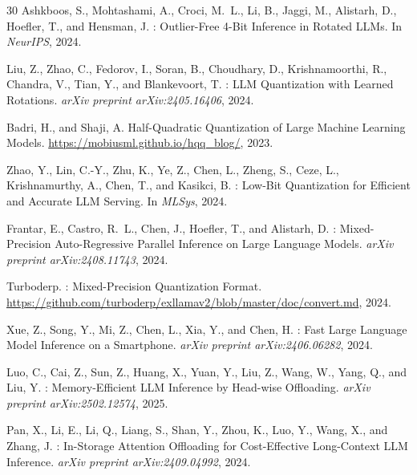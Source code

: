 \documentclass{article}
\begin{document}
\begin{thebibliography}{30}
Ashkboos, S., Mohtashami, A., Croci, M.~L., Li, B., Jaggi, M., Alistarh, D., Hoefler, T., and Hensman, J.
: Outlier-Free 4-Bit Inference in Rotated {LLM}s.
\newblock In \emph{NeurIPS}, 2024.

Liu, Z., Zhao, C., Fedorov, I., Soran, B., Choudhary, D., Krishnamoorthi, R., Chandra, V., Tian, Y., and Blankevoort, T.
: {LLM} Quantization with Learned Rotations.
\newblock \emph{arXiv preprint arXiv:2405.16406}, 2024.

Badri, H., and Shaji, A.
\newblock Half-Quadratic Quantization of Large Machine Learning Models.
\newblock \url{https://mobiusml.github.io/hqq_blog/}, 2023.

Zhao, Y., Lin, C.-Y., Zhu, K., Ye, Z., Chen, L., Zheng, S., Ceze, L., Krishnamurthy, A., Chen, T., and Kasikci, B.
: Low-Bit Quantization for Efficient and Accurate {LLM} Serving.
\newblock In \emph{MLSys}, 2024.

Frantar, E., Castro, R.~L., Chen, J., Hoefler, T., and Alistarh, D.
: Mixed-Precision Auto-Regressive Parallel Inference on Large Language Models.
\newblock \emph{arXiv preprint arXiv:2408.11743}, 2024.

Turboderp.
: Mixed-Precision Quantization Format.
\newblock \url{https://github.com/turboderp/exllamav2/blob/master/doc/convert.md}, 2024.

Xue, Z., Song, Y., Mi, Z., Chen, L., Xia, Y., and Chen, H.
: Fast Large Language Model Inference on a Smartphone.
\newblock \emph{arXiv preprint arXiv:2406.06282}, 2024.

Luo, C., Cai, Z., Sun, Z., Huang, X., Yuan, Y., Liu, Z., Wang, W., Yang, Q., and Liu, Y.
: Memory-Efficient {LLM} Inference by Head-wise Offloading.
\newblock \emph{arXiv preprint arXiv:2502.12574}, 2025.

Pan, X., Li, E., Li, Q., Liang, S., Shan, Y., Zhou, K., Luo, Y., Wang, X., and Zhang, J.
: In-Storage Attention Offloading for Cost-Effective Long-Context {LLM} Inference.
\newblock \emph{arXiv preprint arXiv:2409.04992}, 2024.


\end{thebibliography}
\end{document}
